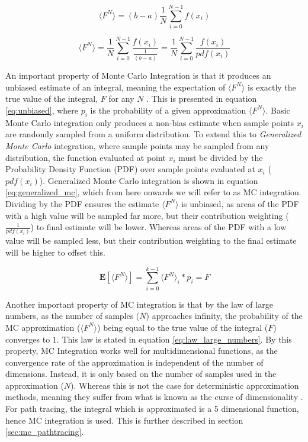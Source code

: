 \documentclass[../dissertation.tex]{subfiles}
\begin{document}
\begin{equation}
\label{eq:monte_carlo}
\langle F^N \rangle = (b - a) \frac{1}{N} \sum^{N-1}_{i=0} f(x_i)
\end{equation}

\begin{equation}
\label{eq:generalized_mc}
\langle F^N \rangle = \frac{1}{N} \sum^{N-1}_{i=0} \frac{f(x_i)}{\frac{1}{(b-a)}} 
 = \frac{1}{N} \sum^{N-1}_{i=0} \frac{f(x_i)}{pdf(x_i)}
\end{equation}

An important property of Monte Carlo Integration is that it produces an unbiased estimate of an integral, meaning the expectation of $\langle F^N \rangle$ is exactly the true value of the integral, $F$ for any $N$ \cite{morokoff1995quasi}. This is presented in equation \ref{eq:unbiased}, where $p_i$ is the probability of a given approximation $\langle F^N \rangle$. Basic Monte Carlo integration only produces a non-bias estimate when sample points $x_i$ are randomly sampled from a uniform distribution. To extend this to \textit{Generalized Monte Carlo} integration, where sample points may be sampled from any distribution, the function evaluated at point $x_i$ must be divided by the Probability Density Function (PDF) over sample points evaluated at $x_i$  ($pdf(x_i)$). Generalized Monte Carlo integration is shown in equation \ref{eq:generalized_mc}, which from here onwards we will refer to as MC integration. Dividing by the PDF ensures the estimate $\langle F^N \rangle$ is unbiased, as areas of the PDF with a high value will be sampled far more, but their contribution weighting ($\frac{1}{pdf(x_i)}$) to final estimate will be lower. Whereas areas of the PDF with a low value will be sampled less, but their contribution weighting to the final estimate will be higher to offset this.

\begin{equation}
\label{eq:unbiased}
\mathbf{E}[\langle F^N \rangle] = \sum_{i = 0}^{k-1} \langle F^N \rangle_i * p_i =  F
\end{equation}

Another important property of MC integration is that by the law of large numbers, as the number of samples ($N$) approaches infinity, the probability of the MC approximation ($\langle F^N \rangle$) being equal to the true value of the integral ($F$) converges to $1$. This law is stated in equation \ref{eq:law_large_numbers}. By this property, MC Integration works well for multidimensional functions, as the convergence rate of the approximation is independent of the number of dimensions. Instead, it is only based on the number of samples used in the approximation ($N$). Whereas this is not the case for deterministic approximation methods, meaning they  suffer from what is known as the curse of dimensionality \cite{bellman1966dynamic}. For path tracing, the integral which is approximated is a 5 dimensional function, hence MC integration is used. This is further described in section \ref{sec:mc_pathtracing}.
\end{document}

